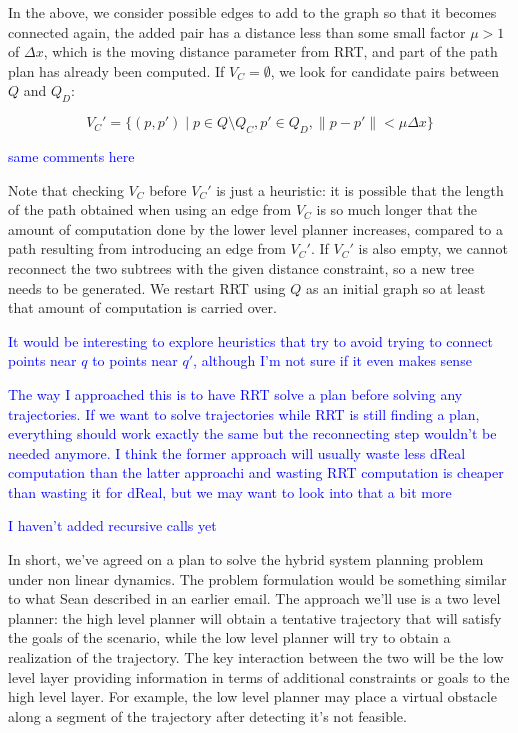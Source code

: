 \documentclass[12pt]{article}
\newcommand\fran[1]{\textcolor{blue}{#1}}
\begin{document}
In the above, we consider possible edges to add to the graph so that it becomes connected again, the added pair has a distance less than some small factor $\mu > 1$ of $\Delta x$, which is the moving distance parameter from RRT, and part of the path plan has already been computed. If $V_C = \emptyset$, we look for candidate pairs between $Q$ and $Q_D$:

\begin{equation}
    \label{eq:unchecked_candidates}
    V_C' = \{(p, p') \mid p \in Q \setminus Q_C, p' \in Q_D, \|p - p'\| < \mu \Delta x\}
\end{equation}

\fran{same comments here}

Note that checking $V_C$ before $V_C'$ is just a heuristic: it is possible that the length of the path obtained when using an edge from $V_C$ is so much longer that the amount of computation done by the lower level planner increases, compared to a path resulting from introducing an edge from $V_C'$. If $V_C'$ is also empty, we cannot reconnect the two subtrees with the given distance constraint, so a new tree needs to be generated. We restart RRT using $Q$ as an initial graph so at least that amount of computation is carried over.

\fran{It would be interesting to explore heuristics that try to avoid trying to connect points near $q$ to points near $q'$, although I'm not sure if it even makes sense}

\fran{The way I approached this is to have RRT solve a plan before solving any trajectories. If we want to solve trajectories while RRT is still finding a plan, everything should work exactly the same but the reconnecting step wouldn't be needed anymore. I think the former approach will usually waste less dReal computation than the latter approachi and wasting RRT computation is cheaper than wasting it for dReal, but we may want to look into that a bit more}

\fran{I haven't added recursive calls yet}

\iffalse
In short, we've agreed on a plan to solve the hybrid system planning problem under non linear dynamics. The problem formulation would be something similar to what Sean described in an earlier email. The approach we'll use is a two level planner: the high level planner will obtain a tentative trajectory that will satisfy the goals of the scenario, while the low level planner will try to obtain a realization of the trajectory. The key interaction between the two will be the low level layer providing information in terms of additional constraints or goals to the high level layer. For example, the low level planner may place a virtual obstacle along a segment of the trajectory after detecting it's not feasible.
\end{document}
